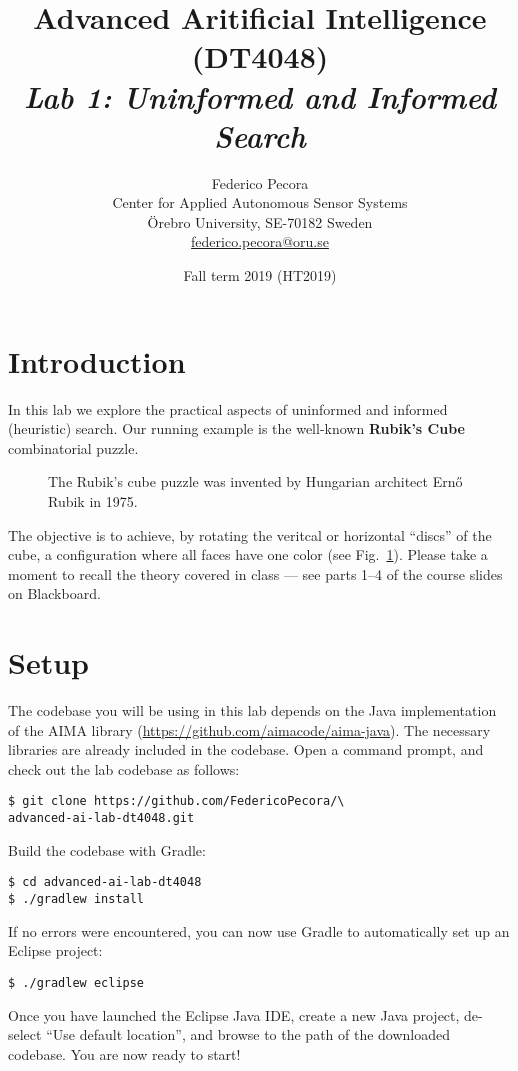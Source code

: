 \documentclass[a4paper]{article}
\title{Advanced Aritificial Intelligence (DT4048)\\{\em Lab 1: Uninformed and Informed Search}}
\author{Federico Pecora\\Center for Applied Autonomous Sensor Systems\\\"Orebro University, SE-70182 Sweden\\\url{federico.pecora@oru.se}}
\date{Fall term 2019 (HT2019)}
\begin{document}
\maketitle

\section{Introduction}

In this lab we explore the practical aspects of uninformed and informed (heuristic) search.  Our running example is the well-known {\bf Rubik's Cube} combinatorial puzzle.
\begin{figure}[!ht]
\centering

\caption{{\small The Rubik's cube puzzle was invented by Hungarian architect Ern\H{o} Rubik in 1975.}}
\label{fig:rc}
\end{figure}
The objective is to achieve, by rotating the veritcal or horizontal ``discs'' of the cube, a configuration where all faces have one color (see Fig.~\ref{fig:rc}).
Please take a moment to recall the theory covered in class --- see parts 1--4 of the course slides on Blackboard.

\section{Setup}
The codebase you will be using in this lab depends on the Java implementation of the AIMA library (\url{https://github.com/aimacode/aima-java}).  The necessary libraries are already included in the codebase.
Open a command prompt, and check out the lab codebase as follows:
\begin{lstlisting}
$ git clone https://github.com/FedericoPecora/\
advanced-ai-lab-dt4048.git
\end{lstlisting}
Build the codebase with Gradle:
\begin{lstlisting}
$ cd advanced-ai-lab-dt4048
$ ./gradlew install
\end{lstlisting}
If no errors were encountered, you can now use Gradle to automatically set up an Eclipse project:
\begin{lstlisting}
$ ./gradlew eclipse
\end{lstlisting}
Once you have launched the Eclipse Java IDE, create a new Java project, de-select ``Use default location'', and browse to the path of the downloaded codebase. You are now ready to start!
\end{document}
